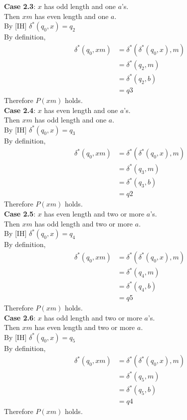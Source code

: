 \documentclass{article}
\begin{document}
\begin{enumerate}
	\textbf{Case 2.3}: $x$ has odd length and one $a$'s. \\
	Then $xm$ has even length and one $a$.\\
	By [IH]  $\delta^*(q_0, x) = q_2$\\
	By definition,
	\begin{align*}
	\delta^*(q_0, xm) &= \delta^*(\delta^*(q_0, x), m)\\
	&= \delta^*(q_2, m)\\
	&= \delta^*(q_2, b) \\
	&= q3
	\end{align*}
	Therefore $P(xm)$ holds. \\
	
	\textbf{Case 2.4}: $x$ has even length and one $a$'s. \\
	Then $xm$ has odd length and one $a$.\\
	By [IH]  $\delta^*(q_0, x) = q_3$\\
	By definition,
	\begin{align*}
	\delta^*(q_0, xm) &= \delta^*(\delta^*(q_0, x), m)\\
	&= \delta^*(q_3, m)\\
	&= \delta^*(q_3, b) \\
	&= q2
	\end{align*}
	Therefore $P(xm)$ holds. \\
	
	\textbf{Case 2.5}: $x$ has even length and two or more $a$'s. \\
	Then $xm$ has odd length and two or more $a$.\\
	By [IH]  $\delta^*(q_0, x) = q_4$\\
	By definition,
	\begin{align*}
	\delta^*(q_0, xm) &= \delta^*(\delta^*(q_0, x), m)\\
	&= \delta^*(q_4, m)\\
	&= \delta^*(q_4, b) \\
	&= q5
	\end{align*}
	Therefore $P(xm)$ holds. \\
	
	\textbf{Case 2.6}: $x$ has odd length and two or more $a$'s. \\
	Then $xm$ has even length and two or more $a$.\\
	By [IH]  $\delta^*(q_0, x) = q_5$\\
	By definition,
	\begin{align*}
	\delta^*(q_0, xm) &= \delta^*(\delta^*(q_0, x), m)\\
	&= \delta^*(q_5, m)\\
	&= \delta^*(q_5, b) \\
	&= q4
	\end{align*}
	Therefore $P(xm)$ holds. \\
	

\end{enumerate}
\end{document}
